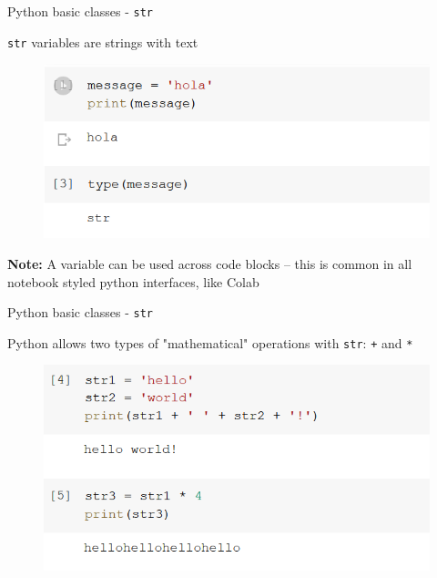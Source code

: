 \documentclass[aspectratio=169]{beamer}
\begin{document}
\begin{frame}{Python basic classes - \texttt{str}}

	\texttt{str} variables are strings with text

	\begin{figure}
		\centering
		\includegraphics[width=0.6\linewidth]{img/string_type.png}
	\end{figure}

	\textbf{Note:} A variable can be used across code blocks 
	-- this is common in all notebook styled python interfaces, like Colab

\end{frame}

\begin{frame}{Python basic classes - \texttt{str}}

	Python allows two types of "mathematical" operations with \texttt{str}: \texttt{+} and \texttt{*}

	\begin{figure}
		\centering
		\includegraphics[width=0.6\linewidth]{img/string_operations.png}
	\end{figure}

\end{frame}
\end{document}
